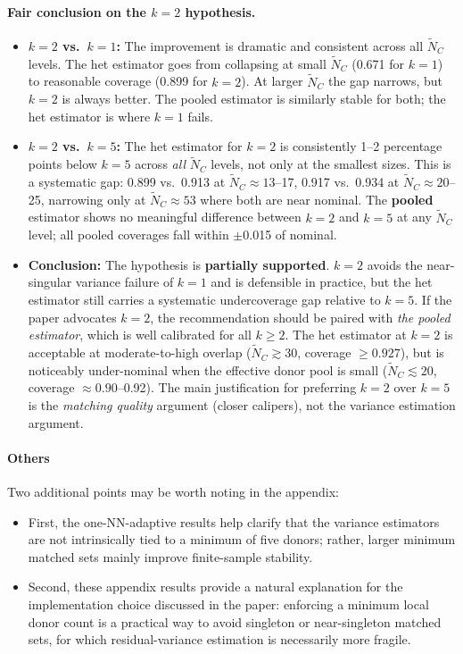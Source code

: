 \documentclass[11pt]{article}
\begin{document}
\paragraph{Fair conclusion on the $k=2$ hypothesis.}

\begin{itemize}
  \item \textbf{$k=2$ vs.\ $k=1$:} The improvement is dramatic and consistent across all $\tilde{N}_C$ levels.
    The het estimator goes from collapsing at small $\tilde{N}_C$ (0.671 for $k=1$) to reasonable coverage (0.899 for $k=2$).
    At larger $\tilde{N}_C$ the gap narrows, but $k=2$ is always better.
    The pooled estimator is similarly stable for both; the het estimator is where $k=1$ fails.

  \item \textbf{$k=2$ vs.\ $k=5$:} The het estimator for $k=2$ is consistently 1--2 percentage points below $k=5$ across \emph{all} $\tilde{N}_C$ levels, not only at the smallest sizes.
    This is a systematic gap: 0.899 vs.\ 0.913 at $\tilde{N}_C\approx 13$--17, 0.917 vs.\ 0.934 at $\tilde{N}_C\approx 20$--25, narrowing only at $\tilde{N}_C\approx 53$ where both are near nominal.
    The \textbf{pooled} estimator shows no meaningful difference between $k=2$ and $k=5$ at any $\tilde{N}_C$ level; all pooled coverages fall within $\pm$0.015 of nominal.

  \item \textbf{Conclusion:} The hypothesis is \textbf{partially supported}.
    $k=2$ avoids the near-singular variance failure of $k=1$ and is defensible in practice, but the het estimator still carries a systematic undercoverage gap relative to $k=5$.
    If the paper advocates $k=2$, the recommendation should be paired with \emph{the pooled estimator}, which is well calibrated for all $k \geq 2$.
    The het estimator at $k=2$ is acceptable at moderate-to-high overlap ($\tilde{N}_C \gtrsim 30$, coverage $\geq 0.927$), but is noticeably under-nominal when the effective donor pool is small ($\tilde{N}_C \lesssim 20$, coverage $\approx 0.90$--0.92).
    The main justification for preferring $k=2$ over $k=5$ is the \emph{matching quality} argument (closer calipers), not the variance estimation argument.
\end{itemize}

\paragraph{Others}
Two additional points may be worth noting in the appendix:
\begin{itemize}
    \item First, the one-NN-adaptive results help clarify that the variance estimators are not intrinsically tied to a minimum of five donors; rather, larger minimum matched sets mainly improve finite-sample stability.
    \item Second, these appendix results provide a natural explanation for the implementation choice discussed in the paper: enforcing a minimum local donor count is a practical way to avoid singleton or near-singleton matched sets, for which residual-variance estimation is necessarily more fragile.
\end{itemize}
\end{document}
